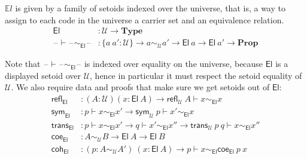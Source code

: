 \documentclass[autoref]{llncs}
\newcommand{\setoidU}{\mathcal{U}}
\newcommand{\mType}{\mathbf{Type}}
\newcommand{\mProp}{\mathbf{Prop}}
\newcommand{\El}{\textsf{El}}
\newcommand{\EL}{\mathds{E}l}
\newcommand{\reflu}{\textsf{refl}_\setoidU}
\newcommand{\symu}{\textsf{sym}_\setoidU}
\newcommand{\transu}{\textsf{trans}_\setoidU}
\newcommand{\coeel}{\textsf{coe}_\El}
\newcommand{\cohel}{\textsf{coh}_\El}
\newcommand{\equ}[2]{#1 \sim_\setoidU #2}
\newcommand{\eqel}[3]{#1 \vdash #2 \sim_\El #3}
\newcommand{\blank}{\mathord{\hspace{1pt}\text{--}\hspace{1pt}}}
\begin{document}
$\EL$ is given by a family of setoids indexed over the universe, that is, a way
to assign to each code in the universe a carrier set and an equivalence
relation.
{\small\vspace{-0.4em}
\begin{align*}
  \El &: \setoidU \to \mType \\
  \blank\vdash\blank\sim_\El\blank &: \{a\ a' : \setoidU\} \to a \sim_\setoidU a' \to \El\ a \to \El\ a' \to \mProp
\end{align*}}\vspace{-1.4em}

Note that $\eqel{\blank}{\blank}{\blank}$ is indexed over equality on the universe, because
$\El$ is a displayed setoid over $\setoidU$, hence in particular it must respect the setoid
equality of $\setoidU$.
%
We also require data and proofs that make sure we get setoids out of $\El$:
{\small\begin{align*}
  \textsf{refl}_\El &: (A : \setoidU) (x : \El\ A) \to \eqel{\reflu\ A}{x}{x} \\
  \textsf{sym}_\El &: \eqel{p}{x}{x'} \to \eqel{\symu\ p}{x'}{x} \\
  \textsf{trans}_\El &: \eqel{p}{x}{x'} \to \eqel{q}{x'}{x''} \to \eqel{\transu\ p\ q}{x}{x''} \\
  \coeel &: \equ{A}{B} \to \El\ A \to \El\ B \\
  \cohel &: (p : \equ{A}{A'}) \ (x : \El\ A) \to \eqel{p}{x}{\coeel\ p\ x}
\end{align*}}\vspace{-1em}
\end{document}
